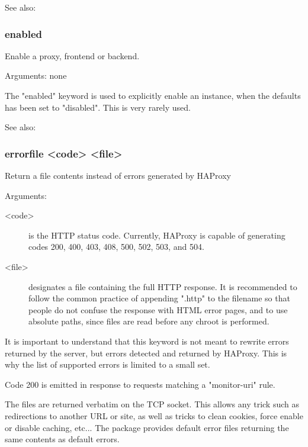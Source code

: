   See also: 

\subsubsection[enabled]{enabled}
  Enable a proxy, frontend or backend.
  
  
  Arguments: none

  The "enabled" keyword is used to explicitly enable an instance, when the
  defaults has been set to "disabled". This is very rarely used.

  See also: 

\subsubsection[errorfile]{errorfile <code> <file>}
  Return a file contents instead of errors generated by HAProxy
  

  Arguments:
  \begin{description}
  \item[<code>]    is the HTTP status code. Currently, HAProxy is capable of
              generating codes 200, 400, 403, 408, 500, 502, 503, and 504.

   \item[<file>]    designates a file containing the full HTTP response. It is
              recommended to follow the common practice of appending ".http" to
              the filename so that people do not confuse the response with HTML
              error pages, and to use absolute paths, since files are read
              before any chroot is performed.
  \end{description}

  It is important to understand that this keyword is not meant to rewrite
  errors returned by the server, but errors detected and returned by HAProxy.
  This is why the list of supported errors is limited to a small set.

  Code 200 is emitted in response to requests matching a "monitor-uri" rule.

  The files are returned verbatim on the TCP socket. This allows any trick such
  as redirections to another URL or site, as well as tricks to clean cookies,
  force enable or disable caching, etc... The package provides default error
  files returning the same contents as default errors.

